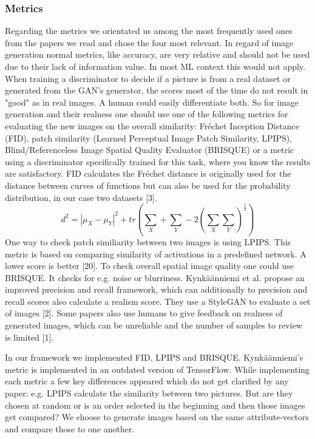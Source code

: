 \documentclass[12pt, a4paper]{article}
\begin{document}
\subsubsection{Metrics}
Regarding the metrics we orientated us among the most frequently used ones from the papers we read and chose the four most relevant. 
In regard of image generation normal metrics, like accuracy, are very relative and should not be used due to their lack of information value. In most ML context this would not apply. When training a discriminator to decide if a picture is from a real dataset or generated from the GAN's generator, the scores most of the time do not result in "good" as in real images. A human could easily differentiate both. 
So for image generation and their realness one should use one of the following metrics for evaluating the new images on the overall similarity: Fréchet Inception Distance (FID), patch similarity (Learned Perceptual Image Patch Similarity, LPIPS), Blind/Referenceless Image Spatial Quality Evaluator (BRISQUE) or a metric using a discriminator specifically trained for this task, where you know the results are satisfactory.
FID calculates the Fréchet distance is originally used for the distance between curves of functions but can also be used for the probability distribution, in our case two datasets [3]. $$d^2 = |\mu_X - \mu_Y|^2 + tr(\sum_X + \sum_Y - 2 (\sum_X \sum_Y)^{\frac{1}{2}})$$
One way to check patch similiarity between two images is using LPIPS. This metric is based on comparing similarity of activations in a predefined network. A lower score is better [20]. 
To check overall spatial image quality one could use BRISQUE. It checks for e.g. noise or blurriness. 
Kynkäänniemi et al. propose an improved precision and recall framework, which can additionally to precision and recall scores also calculate a realism score. They use a StyleGAN to evaluate a set of images [2].
Some papers also use humans to give feedback on realness of generated images, which can be unreliable and the number of samples to review is limited [1].

In our framework we implemented FID, LPIPS and BRISQUE. Kynkäänniemi's metric is implemented in an outdated version of TensorFlow. 
While implementing each metric a few key differences appeared which do not get clarified by any paper: e.g. LPIPS calculate the similarity between two pictures. 
But are they chosen at random or is an order selected in the beginning and then those images get compared? We choose to generate images based on the same attribute-vectors and compare those to one another.
\end{document}
